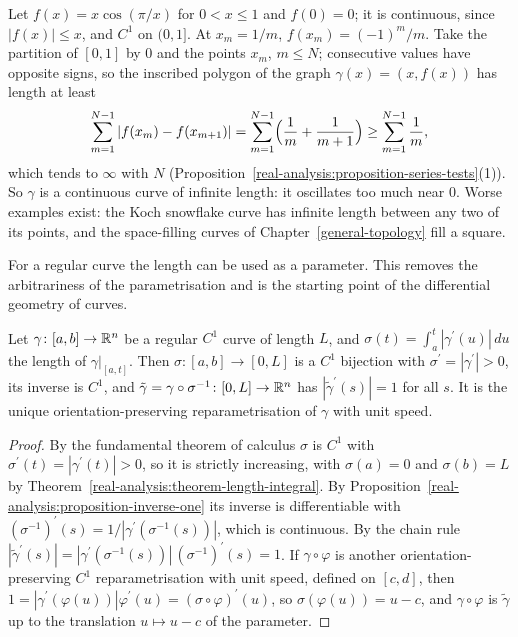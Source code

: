 \begin{counterexample}\label{real-analysis:counterexample-non-rectifiable}
Let $f(x) = x\cos(\pi/x)$ for $0 < x \leq 1$ and $f(0) = 0$; it is continuous, since $|f(x)| \leq x$, and $C^1$ on $(0, 1]$. At $x_m = 1/m$, $f(x_m) = (-1)^m/m$. Take the partition of $[0, 1]$ by $0$ and
the points $x_m$, $m \leq N$; consecutive values have opposite signs, so the inscribed polygon of the graph $\gamma(x) = (x, f(x))$ has length at least
\[
\sum_{m=1}^{N-1}|f(x_m) - f(x_{m+1})| = \sum_{m=1}^{N-1}\Bigl(\frac1m + \frac{1}{m+1}\Bigr) \geq \sum_{m=1}^{N-1}\frac1m,
\]
which tends to $\infty$ with $N$ (Proposition~\ref{real-analysis:proposition-series-tests}(1)). So $\gamma$ is a continuous curve of infinite length: it oscillates too much near $0$. Worse examples exist: the Koch snowflake
curve has infinite length between any two of its points, and the space-filling curves of Chapter~\ref{general-topology} fill a square.
\end{counterexample}

For a regular curve the length can be used as a parameter. This removes the arbitrariness of the parametrisation and is the starting point of the differential geometry of curves.

\begin{proposition}\label{real-analysis:proposition-arc-length}
Let $\gamma \colon [a, b] \to \mathbb{R}^n$ be a regular $C^1$ curve of length $L$, and $\sigma(t) = \int_a^t|\gamma^{\prime}(u)|\,du$ the length of $\gamma|_{[a, t]}$. Then $\sigma \colon [a, b] \to [0, L]$ is a $C^1$ bijection with
$\sigma^{\prime} = |\gamma^{\prime}| > 0$, its inverse is $C^1$, and $\tilde\gamma = \gamma \circ \sigma^{-1} \colon [0, L] \to \mathbb{R}^n$ has $|\tilde\gamma^{\prime}(s)| = 1$ for all $s$. It is the unique orientation-preserving
reparametrisation of $\gamma$ with unit speed.
\end{proposition}

\begin{proof}
By the fundamental theorem of calculus $\sigma$ is $C^1$ with $\sigma^{\prime}(t) = |\gamma^{\prime}(t)| > 0$, so it is strictly increasing, with $\sigma(a) = 0$ and $\sigma(b) = L$ by Theorem~\ref{real-analysis:theorem-length-integral}.
By Proposition~\ref{real-analysis:proposition-inverse-one} its inverse is differentiable with $(\sigma^{-1})^{\prime}(s) = 1/|\gamma^{\prime}(\sigma^{-1}(s))|$, which is continuous. By the chain rule
$|\tilde\gamma^{\prime}(s)| = |\gamma^{\prime}(\sigma^{-1}(s))|\,(\sigma^{-1})^{\prime}(s) = 1$. If $\gamma \circ \varphi$ is another orientation-preserving $C^1$ reparametrisation with unit speed, defined on $[c, d]$, then
$1 = |\gamma^{\prime}(\varphi(u))|\varphi^{\prime}(u) = (\sigma \circ \varphi)^{\prime}(u)$, so $\sigma(\varphi(u)) = u - c$, and $\gamma \circ \varphi$ is $\tilde\gamma$ up to the translation $u \mapsto u - c$ of the parameter.
\end{proof}

